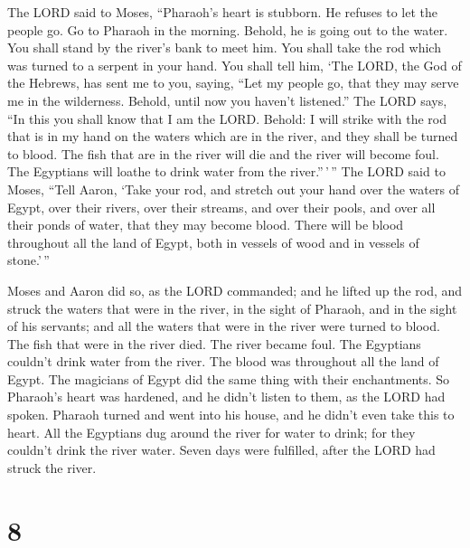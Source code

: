  The LORD said to Moses, ``Pharaoh's heart is stubborn.
He refuses to let the people go.  Go to Pharaoh in the
morning. Behold, he is going out to the water. You shall stand by the
river's bank to meet him. You shall take the rod which was turned to a
serpent in your hand.  You shall tell him, `The LORD, the
God of the Hebrews, has sent me to you, saying, ``Let my people go, that
they may serve me in the wilderness. Behold, until now you haven't
listened.''  The LORD says, ``In this you shall know that
I am the LORD. Behold: I will strike with the rod that is in my hand on
the waters which are in the river, and they shall be turned to blood.
 The fish that are in the river will die and the river
will become foul. The Egyptians will loathe to drink water from the
river.''\,'\,''  The LORD said to Moses, ``Tell Aaron,
`Take your rod, and stretch out your hand over the waters of Egypt, over
their rivers, over their streams, and over their pools, and over all
their ponds of water, that they may become blood. There will be blood
throughout all the land of Egypt, both in vessels of wood and in vessels
of stone.'\,''

 Moses and Aaron did so, as the LORD commanded; and he
lifted up the rod, and struck the waters that were in the river, in the
sight of Pharaoh, and in the sight of his servants; and all the waters
that were in the river were turned to blood.  The fish
that were in the river died. The river became foul. The Egyptians
couldn't drink water from the river. The blood was throughout all the
land of Egypt.  The magicians of Egypt did the same thing
with their enchantments. So Pharaoh's heart was hardened, and he didn't
listen to them, as the LORD had spoken.  Pharaoh turned
and went into his house, and he didn't even take this to heart.
 All the Egyptians dug around the river for water to
drink; for they couldn't drink the river water.  Seven
days were fulfilled, after the LORD had struck the river.

\hypertarget{section-7}{%
\section{8}\label{section-7}}

